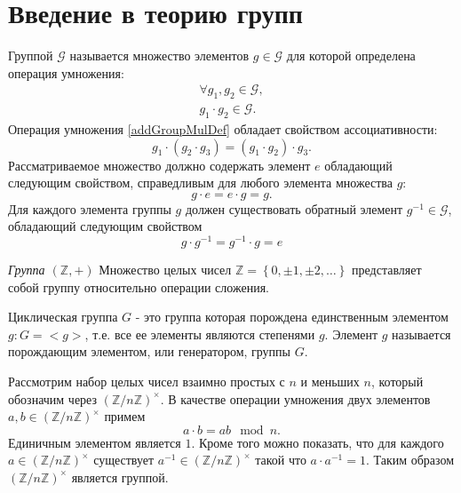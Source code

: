 \section{Введение в теорию групп}
\begin{definition}
Группой $\mathcal{G}$ называется множество элементов $g \in
\mathcal{G}$ для которой определена 
операция умножения:
\begin{eqnarray}
\forall g_1,g_2 \in \mathcal{G},
\nonumber \\
g_1 \cdot g_2 \in \mathcal{G}.
\label{addGroupMulDef}
\end{eqnarray}
Операция умножения \autoref{addGroupMulDef} обладает свойством
ассоциативности:
\begin{equation}
g_1 \cdot \left( g_2 \cdot g_3 \right ) = 
\left( g_1 \cdot  g_2 \right ) \cdot g_3.
\nonumber
\end{equation}
Рассматриваемое множество должно содержать элемент $e$ обладающий
следующим свойством, справедливым для любого элемента множества $g$:
\begin{equation}
g \cdot e = e \cdot g = g.
\nonumber
\end{equation}
Для каждого элемента группы $g$ должен существовать обратный
элемент $g^{-1} \in \mathcal{G}$, обладающий следующим свойством
\begin{equation}
g \cdot g^{-1} = g^{-1} \cdot g = e
\nonumber
\end{equation}
\label{defAddGroup}
\end{definition}

\begin{example}
\emph{Группа $\left(\mathbb{Z}, +\right)$}
Множество целых чисел $\mathbb{Z} = \left\{0, \pm1, \pm2,
\dots\right\}$ представляет собой группу относительно операции сложения.
\nonumber
\end{example}

\begin{definition}
Циклическая группа $G$ - это группа которая порождена единственным
элементом $g: G = <g>$, т.е. все ее элементы являются степенями $g$.
Элемент $g$ называется порождающим элементом, или генератором, группы $G$.
\label{def:add:algebra:cyclic_group}
\end{definition}

\begin{definition}
Рассмотрим набор целых чисел взаимно простых с $n$ и меньших $n$,
который обозначим через $\left(\mathbb{Z}/n\mathbb{Z}\right)^\times$. В
качестве операции умножения двух элементов $a,b \in
\left(\mathbb{Z}/n\mathbb{Z}\right)^\times$ примем
\[
a \cdot b = ab \mod n.
\]
Единичным элементом является $1$. Кроме того можно показать, что для
каждого $a \in \left(\mathbb{Z}/n\mathbb{Z}\right)^\times$
существует $a^{-1} \in \left(\mathbb{Z}/n\mathbb{Z}\right)^\times$
такой что $a \cdot a^{-1} = 1$. Таким образом
$\left(\mathbb{Z}/n\mathbb{Z}\right)^\times$ является группой.
\label{def:add:algebra:mult_group}
\end{definition}

